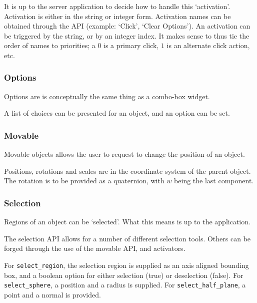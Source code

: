\documentclass[11pt, oneside]{amsart}
\begin{document}
 It is up to the server application to decide how to handle this `activation'. Activation is either in the string or integer form. Activation names can be obtained through the API (example: `Click', `Clear Options'). An activation can be triggered by the string, or by an integer index. It makes sense to thus tie the order of names to priorities; a $0$ is a primary click, $1$ is an alternate click action, etc. 

\subsubsection{Options}

Options are is conceptually the same thing as a combo-box widget.



 A list of choices can be presented for an object, and an option can be set. 

\subsubsection{Movable}

Movable objects allows the user to request to change the position of an object.



Positions, rotations and scales are in the coordinate system of the parent object. The rotation is to be provided as a quaternion, with $w$ being the last component.

\subsubsection{Selection}

Regions of an object can be `selected'. What this means is up to the application.



The selection API allows for a number of different selection tools. Others can be forged through the use of the movable API, and activators.

For \texttt{select\_region}, the selection region is supplied as an axis aligned bounding box, and a boolean option for either selection (true) or deselection (false). For \texttt{select\_sphere}, a position and a radius is supplied. For \texttt{select\_half\_plane}, a point and a normal is provided.
\end{document}

